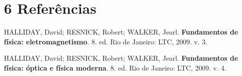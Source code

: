 \section*{6 Referências}

HALLIDAY, David; RESNICK, Robert; WALKER, Jearl. \textbf{Fundamentos de física: eletromagnetismo}. 8. ed. Rio de Janeiro: LTC, 2009. v. 3.

HALLIDAY, David; RESNICK, Robert; WALKER, Jearl. \textbf{Fundamentos de física: óptica e física moderna}. 8. ed. Rio de Janeiro: LTC, 2009. v. 4.
